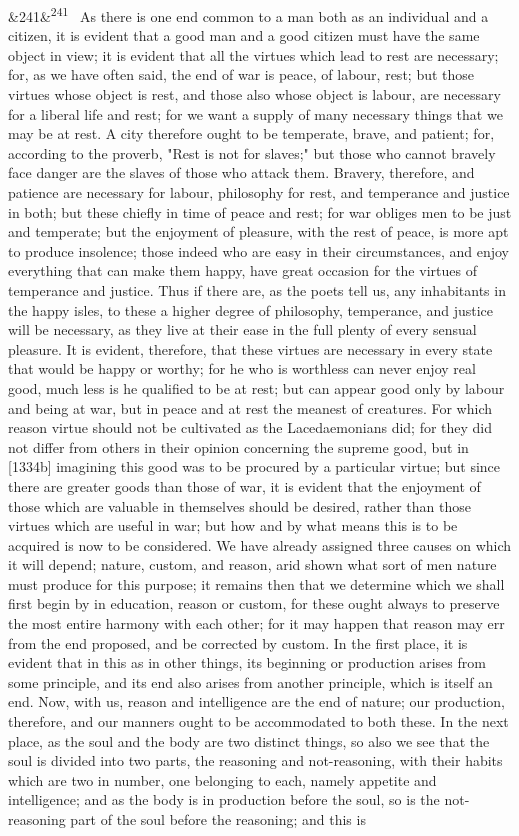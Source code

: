 \documentclass[12pt]{article}
\newcommand{\para}[1][]{\par\noindent\ifx&#1&\else\textsuperscript{\footnotesize #1}~\fi}
\begin{document}
\para[241] As there is one end common to a man both as an individual and a citizen, it is evident that a good man and a good citizen must have the same object in view; it is evident that all the virtues which lead to rest are necessary; for, as we have often said, the end of war is peace, of labour, rest; but those virtues whose object is rest, and those also whose object is labour, are necessary for a liberal life and rest; for we want a supply of many necessary things that we may be at rest. A city therefore ought to be temperate, brave, and patient; for, according to the proverb, "Rest is not for slaves;" but those who cannot bravely face danger are the slaves of those who attack them. Bravery, therefore, and patience are necessary for labour, philosophy for rest, and temperance and justice in both; but these chiefly in time of peace and rest; for war obliges men to be just and temperate; but the enjoyment of pleasure, with the rest of peace, is more apt to produce insolence; those indeed who are easy in their circumstances, and enjoy everything that can make them happy, have great occasion for the virtues of temperance and justice. Thus if there are, as the poets tell us, any inhabitants in the happy isles, to these a higher degree of philosophy, temperance, and justice will be necessary, as they live at their ease in the full plenty of every sensual pleasure. It is evident, therefore, that these virtues are necessary in every state that would be happy or worthy; for he who is worthless can never enjoy real good, much less is he qualified to be at rest; but can appear good only by labour and being at war, but in peace and at rest the meanest of creatures. For which reason virtue should not be cultivated as the Lacedaemonians did; for they did not differ from others in their opinion concerning the supreme good, but in [1334b] imagining this good was to be procured by a particular virtue; but since there are greater goods than those of war, it is evident that the enjoyment of those which are valuable in themselves should be desired, rather than those virtues which are useful in war; but how and by what means this is to be acquired is now to be considered. We have already assigned three causes on which it will depend; nature, custom, and reason, arid shown what sort of men nature must produce for this purpose; it remains then that we determine which we shall first begin by in education, reason or custom, for these ought always to preserve the most entire harmony with each other; for it may happen that reason may err from the end proposed, and be corrected by custom. In the first place, it is evident that in this as in other things, its beginning or production arises from some principle, and its end also arises from another principle, which is itself an end. Now, with us, reason and intelligence are the end of nature; our production, therefore, and our manners ought to be accommodated to both these. In the next place, as the soul and the body are two distinct things, so also we see that the soul is divided into two parts, the reasoning and not-reasoning, with their habits which are two in number, one belonging to each, namely appetite and intelligence; and as the body is in production before the soul, so is the not-reasoning part of the soul before the reasoning; and this is 
\end{document}
